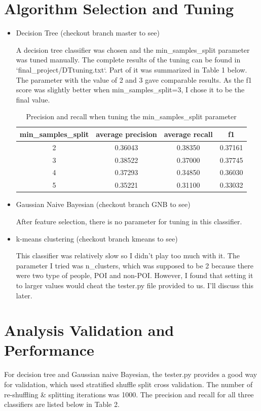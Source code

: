 \documentclass[12pt]{article}
\begin{document}
\section{Algorithm Selection and Tuning}
\begin{itemize}
\item Decision Tree (checkout branch master to see)

A decision tree classifier was chosen and the min\_samples\_split parameter was tuned manually. The complete results of the tuning can be found in ‘final\_project/DTtuning.txt‘. Part of it was summarized in Table 1 below. The parameter with the value of 2 and 3 gave comparable results. As the f1 score was slightly better when min\_samples\_split=3, I chose it to be the final value.

\begin{table}[h]
\caption{Precision and recall when tuning the min\_samples\_split parameter}
\centering
\begin{tabular}{cccc}
\toprule
min\_samples\_split & average precision & average recall & f1 \\
\midrule
2 & 0.36043 & 0.38350 & 0.37161 \\
3 & 0.38522 & 0.37000 & 0.37745 \\
4 & 0.37293 & 0.34850 & 0.36030 \\
5 & 0.35221 & 0.31100 & 0.33032 \\
\bottomrule
\end{tabular}
\end{table}


\item Gaussian Naive Bayesian (checkout branch GNB to see)

After feature selection, there is no parameter for tuning in this classifier.
\item k-means clustering (checkout branch kmeans to see)

This classifier was relatively slow so I didn't play too much with it. The parameter I tried was n\_clusters, which was supposed to be 2 because there were two type of people, POI and non-POI. However, I found that setting it to larger values would cheat the tester.py file provided to us. I'll discuss this later.
\end{itemize}
\section{Analysis Validation and Performance}
For decision tree and Gaussian naive Bayesian, the tester.py provides a good way for validation, which used stratified shuffle split cross validation.  The number of re-shuffling \& splitting iterations was 1000. The precision and recall for all three classifiers are listed below in Table 2.
\end{document}
